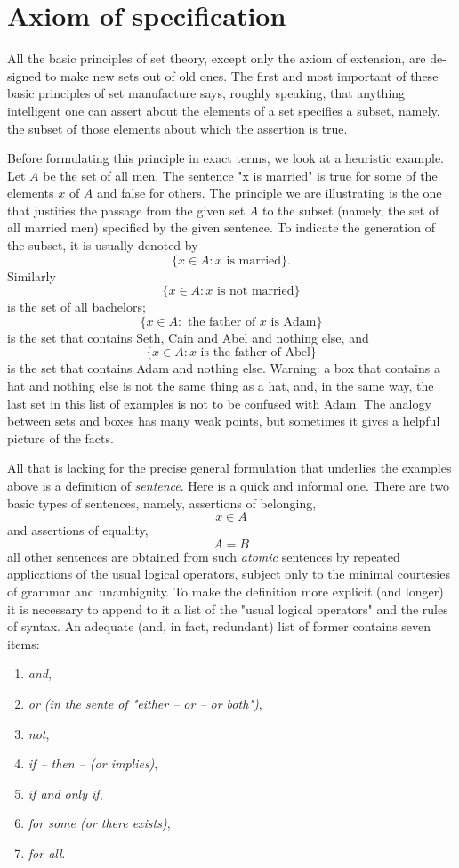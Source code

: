 \section{Axiom of specification}

All the basic principles of set theory, except only the axiom of extension, are de-
signed to make new sets out of old ones. The first and most important of these basic
principles of set manufacture says, roughly speaking, that anything intelligent one
can assert about the elements of a set specifies a subset, namely, the subset of those
elements about which the assertion is true. 

Before formulating this principle in exact terms, we look at a heuristic example. Let $A$ be the set of all men. The sentence "x is married" is true for some of the elements $x$ of $A$ and false for others. The principle we are illustrating is the one that justifies the passage from the given set $A$ to the subset (namely, the set of all married men) specified by the given sentence. To indicate the generation of the subset, it is usually denoted by
\[
	\{ x \in A : x \text{ is married}\}.
\]
Similarly
\[
	\{ x \in A : x \text{ is not married}\}
\]
is the set of all bachelors;
\[
	\{ x \in A : \text{ the father of } x \text{ is Adam}\}
\]
is the set that contains Seth, Cain and Abel and nothing else, and
\[
	\{ x \in A: x \text{ is the father of Abel}\}
\]
is the set that contains Adam and nothing else. Warning: a box that contains a hat and nothing else is not the same thing as a hat, and, in the same way, the last set in this list of examples is not to be confused with Adam. The analogy between sets and boxes has many weak points, but sometimes it gives a helpful picture of the facts.

All that is lacking for the precise general formulation that underlies the examples above is a definition of \textit{sentence}. Here is a quick and informal one. There are two basic types of sentences, namely, assertions of belonging,
\[
	x \in A
\]
and assertions of equality,
\[
	A = B
\]
all other sentences are obtained from such \textit{atomic} sentences by repeated applications of the usual logical operators, subject only to the minimal courtesies of grammar and unambiguity. To make the definition more explicit (and longer) it is necessary to append to it a list of the "usual logical operators" and the rules of syntax. An adequate (and, in fact, redundant) list of former contains seven items:
\begin{enumerate}
	\item \textit{and},
	\item \textit{or (in the sente of "either -- or -- or both")},
	\item \textit{not},
	\item \textit{if -- then -- (or implies)},
	\item \textit{if and only if},
	\item \textit{for some (or there exists)},
	\item \textit{for all}.
\end{enumerate}

